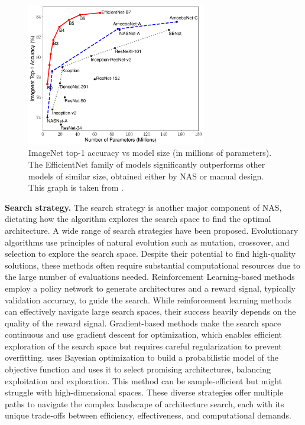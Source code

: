 \begin{figure}[htbp]
  \centering
  \includegraphics[width=0.70\textwidth]{chapter_sota/assets/efficientnet_perfs_overview.pdf}
  \caption{ImageNet top-1 accuracy vs model size (in millions of parameters).
    The EfficientNet family of models significantly outperforms other models of
    similar size, obtained either by \ac{NAS} or manual design. This graph is
    taken from \cite{DBLP:conf/icml/TanL19}.
  }
  \label{fig:sota:efficientnet_perfs}
\end{figure}


\noindent\textbf{Search strategy.} The search strategy is another major
component of \ac{NAS}, dictating how the algorithm explores the search space to
find the optimal architecture. A wide range of search strategies have been
proposed. Evolutionary algorithms \cite{DBLP:conf/icml/RealMSSSTLK17} use
principles of natural evolution such as mutation, crossover, and selection to
explore the search space. Despite their potential to find high-quality
solutions, these methods often require substantial computational resources due
to the large number of evaluations needed. Reinforcement Learning-based methods
\cite{DBLP:conf/iclr/ZophL17} employ a policy network to generate architectures
and a reward signal, typically validation accuracy, to guide the search. While
reinforcement learning methods can effectively navigate large search spaces,
their success heavily depends on the quality of the reward signal.
Gradient-based methods \cite{DBLP:conf/iclr/LiuSY19,DBLP:conf/iclr/XuX0CQ0X20}
make the search space continuous and use gradient descent for optimization,
which enables efficient exploration of the search space but requires careful
regularization to prevent overfitting. \cite{DBLP:conf/nips/BergstraBBK11} uses
Bayesian optimization to build a probabilistic model of the objective function
and uses it to select promising architectures, balancing exploitation and
exploration. This method can be sample-efficient but might struggle with
high-dimensional spaces. These diverse strategies offer multiple paths to
navigate the complex landscape of architecture search, each with its unique
trade-offs between efficiency, effectiveness, and computational demands.\\


